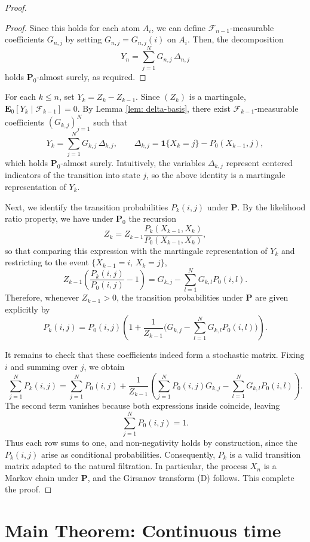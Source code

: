 \documentclass{lms}
\begin{document}
\begin{proof}
\begin{proof}
Since this holds for each atom \( A_i \), we can define \( \mathscr{F}_{n-1} \)-measurable coefficients \( G_{n,j} \) by setting \( G_{n,j} = G_{n,j}(i) \) on \( A_i \). Then, the decomposition
\[Y_n = \sum_{j=1}^N G_{n,j} \, \Delta_{n,j}\]
holds \( \mathbf{P}_0 \)-almost surely, as required.
\end{proof}

For each $k \leq n$, set $Y_k = Z_k - Z_{k-1}$. Since $(Z_k)$ is a martingale, $\mathbf{E}_0[Y_k \mid \mathscr{F}_{k-1}] = 0$. By Lemma \ref{lem: delta-basis}, there exist $\mathscr{F}_{k-1}$-measurable coefficients $(G_{k,j})_{j=1}^N$ such that
$$Y_k = \sum_{j=1}^N G_{k,j}\,\Delta_{k,j}, 
\qquad \Delta_{k,j} = \mathbf{1}{\{X_k=j\}} - P_0(X_{k-1},j),$$
which holds $\mathbf P_0$-almost surely. Intuitively, the variables $\Delta_{k,j}$ represent centered indicators of the transition into state $j$, so the above identity is a martingale representation of $Y_k$. 

Next, we identify the transition probabilities $P_k(i,j)$ under $\mathbf P$. By the likelihood ratio property, we have under $\mathbf P_0$ the recursion
$$Z_k = Z_{k-1}\frac{P_{k}(X_{k-1},X_k)}{P_0(X_{k-1},X_k)},$$
so that comparing this expression with the martingale representation of $Y_k$ and restricting to the event $\{X_{k-1}=i,\,X_k=j\}$,
$$Z_{k-1}\!\left(\frac{P_{k}(i,j)}{P_0(i,j)}-1\right) = G_{k,j} - \sum_{l=1}^N G_{k,l}P_0(i,l).$$
Therefore, whenever $Z_{k-1}>0$, the transition probabilities under $\mathbf P$ are given explicitly by
$$P_{k}(i,j) = P_0(i,j)\left(1+\frac{1}{Z_{k-1}}\Big(G_{k,j}-\sum_{l=1}^N G_{k,l}P_0(i,l)\Big)\right).$$

It remains to check that these coefficients indeed form a stochastic matrix. Fixing $i$ and summing over $j$, we obtain
$$
\sum_{j=1}^N P_{k}(i,j)
= \sum_{j=1}^N P_0(i,j) 
+ \frac{1}{Z_{k-1}}\!\left(\sum_{j=1}^N P_0(i,j)G_{k,j} - \sum_{l=1}^N G_{k,l}P_0(i,l)\right).
$$
The second term vanishes because both expressions inside coincide, leaving
$$\sum_{j=1}^N P_0(i,j)  = 1.$$
Thus each row sums to one, and non-negativity holds by construction, since the $P_k(i,j)$ arise as conditional probabilities. Consequently, $P_k$ is a valid transition matrix adapted to the natural filtration. In particular, the process $X_n$ is a Markov chain under $\mathbf{P}$, and the Girsanov transform (D) follows.  This complete the proof.  \end{proof}





\section{Main Theorem: Continuous time}
\end{document}
